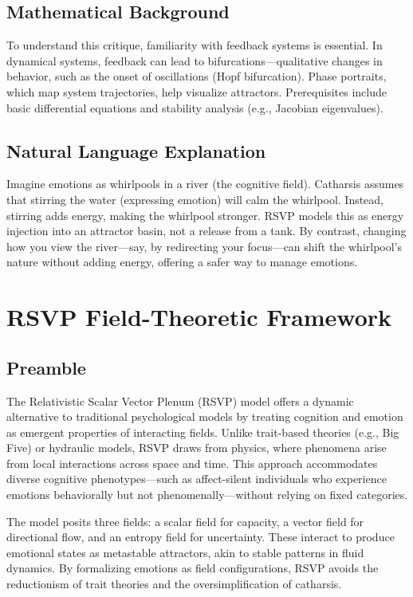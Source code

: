 \documentclass[11pt]{article}
\theoremstyle{plain}
\begin{document}
\subsection{Mathematical Background}
To understand this critique, familiarity with feedback systems is essential. In dynamical systems, feedback can lead to bifurcations—qualitative changes in behavior, such as the onset of oscillations (Hopf bifurcation). Phase portraits, which map system trajectories, help visualize attractors. Prerequisites include basic differential equations and stability analysis (e.g., Jacobian eigenvalues).

\subsection{Natural Language Explanation}
Imagine emotions as whirlpools in a river (the cognitive field). Catharsis assumes that stirring the water (expressing emotion) will calm the whirlpool. Instead, stirring adds energy, making the whirlpool stronger. RSVP models this as energy injection into an attractor basin, not a release from a tank. By contrast, changing how you view the river—say, by redirecting your focus—can shift the whirlpool’s nature without adding energy, offering a safer way to manage emotions.

\section{RSVP Field-Theoretic Framework}

\subsection{Preamble}
The Relativistic Scalar Vector Plenum (RSVP) model offers a dynamic alternative to traditional psychological models by treating cognition and emotion as emergent properties of interacting fields. Unlike trait-based theories (e.g., Big Five) or hydraulic models, RSVP draws from physics, where phenomena arise from local interactions across space and time. This approach accommodates diverse cognitive phenotypes—such as affect-silent individuals who experience emotions behaviorally but not phenomenally—without relying on fixed categories.

The model posits three fields: a scalar field for capacity, a vector field for directional flow, and an entropy field for uncertainty. These interact to produce emotional states as metastable attractors, akin to stable patterns in fluid dynamics. By formalizing emotions as field configurations, RSVP avoids the reductionism of trait theories and the oversimplification of catharsis.
\end{document}
